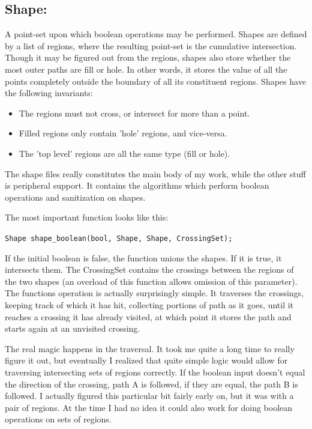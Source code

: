 \documentclass[openany]{book}
\begin{document}
\subsection{Shape:}
A point-set upon which boolean operations may be performed. Shapes are defined by a list of regions, where the resulting point-set is the cumulative intersection. Though it may be figured out from the regions, shapes also store whether the most outer paths are fill or hole. In other words, it stores the value of all the points completely outside the boundary of all its constituent regions. Shapes have the following invariants:

\begin{itemize}
\item{ The regions must not cross, or intersect for more than a point.}
\item{ Filled regions only contain 'hole' regions, and vice-versa.}
\item{ The 'top level' regions are all the same type (fill or hole).}
\end{itemize}

The shape files really constitutes the main body of my work, while the other stuff is peripheral support. It contains the algorithms which perform boolean operations and sanitization on shapes.

The most important function looks like this:

\verb|Shape shape_boolean(bool, Shape, Shape, CrossingSet);|

If the initial boolean is false, the function unions the shapes. If it is true, it intersects them. The CrossingSet contains the crossings between the regions of the two shapes (an overload of this function allows omission of this parameter). The functions operation is actually surprisingly simple. It traverses the crossings, keeping track of which it has hit, collecting portions of path as it goes, until it reaches a crossing it has already visited, at which point it stores the path and starts again at an unvisited crossing.

The real magic happens in the traversal. It took me quite a long time to really figure it out, but eventually I realized that quite simple logic would allow for traversing intersecting sets of regions correctly. If the boolean input doesn't equal the direction of the crossing, path A is followed, if they are equal, the path B is followed. I actually figured this particular bit fairly early on, but it was with a pair of regions. At the time I had no idea it could also work for doing boolean operations on sets of regions.
\end{document}
